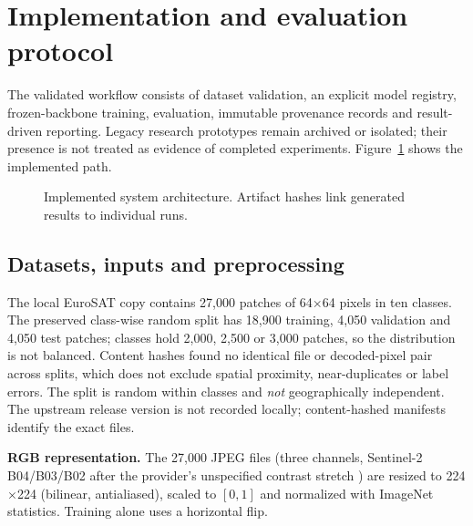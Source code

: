 \documentclass[3p,times,procedia]{elsarticle}
\begin{document}
\section{Implementation and evaluation protocol}\label{sec:implementation}
The validated workflow consists of dataset validation, an explicit model registry, frozen-backbone training, evaluation, immutable provenance records and result-driven reporting. Legacy research prototypes remain archived or isolated; their presence is not treated as evidence of completed experiments. Figure~\ref{fig:architecture} shows the implemented path.
\begin{figure}[htbp]\centering
{}
\caption{Implemented system architecture. Artifact hashes link generated results to individual runs.}\label{fig:architecture}
\end{figure}

\subsection{Datasets, inputs and preprocessing}\label{sec:data}
The local EuroSAT copy contains 27,000 patches of 64$\times$64 pixels in ten classes. The preserved class-wise random split has 18,900 training, 4,050 validation and 4,050 test patches; classes hold 2,000, 2,500 or 3,000 patches, so the distribution is not balanced. Content hashes found no identical file or decoded-pixel pair across splits, which does not exclude spatial proximity, near-duplicates or label errors. The split is random within classes and \emph{not} geographically independent. The upstream release version is not recorded locally; content-hashed manifests identify the exact files.

\textbf{RGB representation.} The 27,000 JPEG files (three channels, Sentinel-2 B04/B03/B02 after the provider's unspecified contrast stretch \cite{eurosat}) are resized to 224$\times$224 (bilinear, antialiased), scaled to $[0,1]$ and normalized with ImageNet statistics. Training alone uses a horizontal flip.
\end{document}
